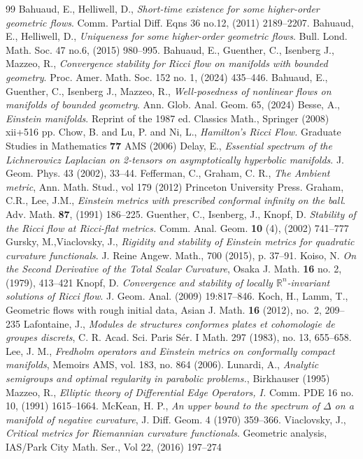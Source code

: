 \documentclass[10pt,reqno]{amsart}
\begin{document}
\begin{thebibliography}{99}
 Bahuaud, E., Helliwell, D., \emph{Short-time existence for some higher-order geometric flows}. Comm. Partial Diff. Eqns 36 no.12, (2011) 2189--2207.
 Bahuaud, E., Helliwell, D., \emph{Uniqueness for some higher-order geometric flows}. Bull. Lond. Math. Soc. 47 no.6, (2015) 980--995.
 Bahuaud, E., Guenther, C., Isenberg J., Mazzeo, R., \emph{Convergence stability for Ricci flow on manifolds with bounded geometry}. Proc. Amer. Math. Soc. 152 no. 1, (2024) 435--446.
 Bahuaud, E., Guenther, C., Isenberg J., Mazzeo, R., \emph{Well-posedness of nonlinear flows on manifolds of bounded geometry}. Ann. Glob. Anal. Geom. 65, (2024)
 Besse, A., \emph{Einstein manifolds}. Reprint of the 1987 ed. Classics Math., Springer (2008) xii+516 pp.
 Chow, B. and Lu, P. and Ni, L., \emph{Hamilton's Ricci Flow.} Graduate Studies in Mathematics {\bf 77} AMS (2006)  
 Delay, E., \emph{Essential spectrum of the Lichnerowicz Laplacian on 2-tensors on asymptotically hyperbolic manifolds}. J. Geom. Phys. 43 (2002),  33--44.
 Fefferman, C., Graham, C. R., \emph{The {A}mbient metric}, Ann. Math. Stud., vol 179 (2012) Princeton
University Press.
 Graham, C.R., Lee, J.M., \emph{Einstein metrics with prescribed conformal infinity on the ball}. Adv. Math. {\bf 87}, (1991) 186--225.
 Guenther, C., Isenberg, J., Knopf, D. \emph{Stability of the Ricci flow at Ricci-flat metrics.} Comm. Anal. Geom. {\bf 10} (4), (2002) 741--777 
 Gursky, M.,Viaclovsky, J., \emph{Rigidity and stability of Einstein metrics for quadratic curvature functionals}. J. Reine Angew. Math., 700 (2015), p. 37--91.
 Koiso, N. \emph{On the Second Derivative of the Total Scalar Curvature}, Osaka J. Math. {\bf 16} no. 2, (1979), 413--421
 Knopf, D. \emph{Convergence and stability of locally $\mathbb{R}^n$-invariant solutions of {R}icci flow}. J. Geom. Anal. (2009) 19:817--846.
 Koch, H., Lamm, T., Geometric flows with rough initial data, Asian J. Math. {\bf 16} (2012), no.~2, 209--235
 Lafontaine, J., \emph{Modules de structures conformes plates et cohomologie de groupes
discrets}, C. R. Acad. Sci. Paris S\'er. I Math. 297 (1983), no. 13, 655--658.
 Lee, J. M., \emph{Fredholm operators and Einstein metrics on conformally compact manifolds}, Memoirs AMS, vol. 183, no. 864 (2006).
 Lunardi, A., \emph{Analytic semigroups and optimal regularity in parabolic problems.}, Birkhauser (1995)
 Mazzeo, R., \emph{Elliptic theory of Differential Edge Operators, I.} Comm. PDE 16 no. 10, (1991) 1615--1664.
 McKean, H. P., \emph{ An upper bound to the spectrum of $\Delta$ on a manifold of negative curvature}, J. Diff. Geom. 4 (1970) 359--366.
 Viaclovsky, J., \emph{Critical metrics for Riemannian curvature functionals}. Geometric analysis, IAS/Park City Math. Ser., Vol 22, (2016) 197--274
\end{thebibliography}
\end{document}
